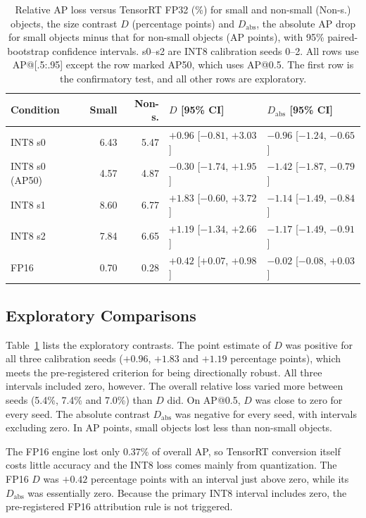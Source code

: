 \documentclass[conference]{IEEEtran}
\begin{document}
\begin{table}[!t]
\caption{Relative AP loss versus TensorRT FP32 (\%) for small and non-small (Non-s.) objects,
the size contrast $D$ (percentage points) and $D_{\mathrm{abs}}$, the absolute AP drop for small
objects minus that for non-small objects (AP points), with 95\% paired-bootstrap confidence
intervals. s0--s2 are INT8 calibration seeds 0--2. All rows use AP@[.5:.95] except the row marked
AP50, which uses AP@0.5. The first row is the confirmatory test, and all other rows are
exploratory.}
\label{tab:contrasts}
\centering
\scriptsize
\setlength{\tabcolsep}{2pt}
\begin{tabular}{lrrll}
\hline
Condition & Small & Non-s. & $D$ [95\% CI] & $D_{\mathrm{abs}}$ [95\% CI] \\
\hline
INT8 s0          & 6.43 & 5.47 & $+0.96$ [$-0.81$, $+3.03$] & $-0.96$ [$-1.24$, $-0.65$] \\
INT8 s0 (AP50)   & 4.57 & 4.87 & $-0.30$ [$-1.74$, $+1.95$] & $-1.42$ [$-1.87$, $-0.79$] \\
INT8 s1          & 8.60 & 6.77 & $+1.83$ [$-0.60$, $+3.72$] & $-1.14$ [$-1.49$, $-0.84$] \\
INT8 s2          & 7.84 & 6.65 & $+1.19$ [$-1.34$, $+2.66$] & $-1.17$ [$-1.49$, $-0.91$] \\
FP16             & 0.70 & 0.28 & $+0.42$ [$+0.07$, $+0.98$] & $-0.02$ [$-0.08$, $+0.03$] \\
\hline
\end{tabular}
\end{table}

\subsection{Exploratory Comparisons}
Table~\ref{tab:contrasts} lists the exploratory contrasts. The point estimate of $D$ was positive
for all three calibration seeds ($+0.96$, $+1.83$ and $+1.19$ percentage points), which meets the
pre-registered criterion for being directionally robust. All three intervals included zero,
however. The overall relative loss
varied more between seeds (5.4\%, 7.4\% and 7.0\%) than $D$ did. On AP@0.5, $D$ was close to zero
for every seed. The absolute contrast $D_{\mathrm{abs}}$ was negative for every seed, with
intervals excluding zero. In AP points, small objects lost less than non-small objects.

The FP16 engine lost only 0.37\% of overall AP, so TensorRT conversion itself costs little
accuracy and the INT8 loss comes mainly from quantization. The FP16 $D$ was $+0.42$ percentage points
with an interval just above zero, while its $D_{\mathrm{abs}}$ was essentially zero. Because the
primary INT8 interval includes zero, the pre-registered FP16 attribution rule is not triggered.
\end{document}
